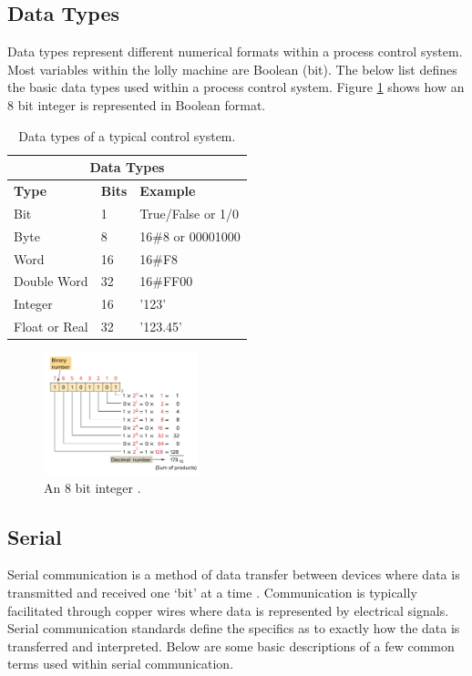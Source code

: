 \subsection{Data Types}
    Data types represent different numerical formats within a process control system. Most variables within the lolly machine are Boolean (bit). The below list defines the basic data types used within a process control system. Figure \ref{fig:int} shows how an 8 bit integer is represented in Boolean format.
    \begin{table}
    \centering
    \caption{Data types of a typical control system.}
        \begin{tabular}{ |p{3cm}|p{2cm}|p{3cm}|  }
                \hline
                \multicolumn{3}{|c|}{\textbf{Data Types}} \\
                \hline
                \textbf{Type}& \textbf{Bits}& \textbf{Example} \\
                \hline
                Bit & 1 & True/False or 1/0 \\
                Byte & 8 & 16\#8 or 00001000 \\
                Word & 16 & 16\#F8 \\
                Double Word & 32 & 16\#FF00 \\
                Integer & 16 & '123' \\
                Float or Real & 32 & '123.45'\\
                \hline
        \end{tabular}
        \label{table:dataTypes}   
        
    \end{table}
    

        \begin{figure}[H]
            \centering
            \includegraphics[width = 0.4\textwidth]{2_images/int.png}
            \caption{An 8 bit integer \cite{petruzella2017programmable}.}
            \label{fig:int}
        \end{figure}         

\subsection{Serial}
    Serial communication is a method of data transfer between devices where data is transmitted and received one `bit' at a time \cite{frenzel2015handbook}. Communication is typically facilitated through copper wires where data is represented by electrical signals. Serial communication standards define the specifics as to exactly how the data is transferred and interpreted. Below are some basic descriptions of a few common terms used within serial communication.
    
